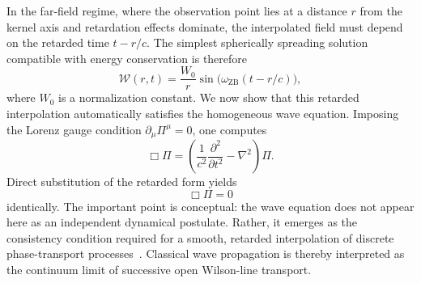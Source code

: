 \documentclass[%
 reprint, amsmath,amssymb, aps, prb, ]{revtex4-2}
\numberwithin{equation}{section}
\newcommand{\omZB}{\omega_{\text{ZB}}}
\newcommand{\WL}{\mathcal{W}}
\begin{document}
In the far-field regime, where the observation point lies at a distance $r$ from the kernel axis and retardation effects dominate, the interpolated field must depend on the retarded time $t - r/c$. The simplest spherically spreading solution compatible with energy conservation is therefore
\begin{equation}
\WL(r,t) = \frac{W_0}{r}\sin\!\bigl(\omZB (t - r/c)\bigr),
\end{equation}
where $W_0$ is a normalization constant. We now show that this retarded interpolation automatically satisfies the homogeneous wave equation. Imposing the Lorenz gauge condition $\partial_\mu\Pi^\mu = 0$, one computes
\begin{equation}
\Box \Pi
= \left(\frac{1}{c^2}\frac{\partial^2}{\partial t^2} - \nabla^2 \right)\Pi.
\end{equation}
Direct substitution of the retarded form yields
\begin{equation}
\Box\Pi = 0
\end{equation}
identically. The important point is conceptual: the wave equation does not appear here as an independent dynamical postulate. Rather, it emerges as the consistency condition required for a smooth, retarded interpolation of discrete phase-transport processes~\cite{Jackson1998}. Classical wave propagation is thereby interpreted as the continuum limit of successive open Wilson-line transport.

\clearpage

\end{document}
